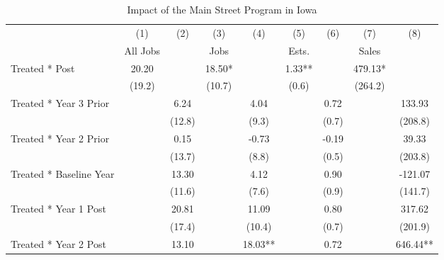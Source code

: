 \begin{table}[htbp]\centering
\def\sym#1{\ifmmode^{#1}\else\(^{#1}\)\fi}
\caption{Impact of the Main Street Program in Iowa}
\begin{tabular}{l*{8}{c}}
\hline\hline
            &\multicolumn{1}{c}{(1)}   &\multicolumn{1}{c}{(2)}   &\multicolumn{1}{c}{(3)}   &\multicolumn{1}{c}{(4)}   &\multicolumn{1}{c}{(5)}   &\multicolumn{1}{c}{(6)}   &\multicolumn{1}{c}{(7)}   &\multicolumn{1}{c}{(8)}   \\
            &    All Jobs   &               &        Jobs   &               &       Ests.   &               &       Sales   &               \\
\hline
Treated * Post&       20.20   &               &       18.50*  &               &        1.33** &               &      479.13*  &               \\
            &      (19.2)   &               &      (10.7)   &               &       (0.6)   &               &     (264.2)   &               \\
Treated * Year 3 Prior&               &        6.24   &               &        4.04   &               &        0.72   &               &      133.93   \\
            &               &      (12.8)   &               &       (9.3)   &               &       (0.7)   &               &     (208.8)   \\
Treated * Year 2 Prior&               &        0.15   &               &       -0.73   &               &       -0.19   &               &       39.33   \\
            &               &      (13.7)   &               &       (8.8)   &               &       (0.5)   &               &     (203.8)   \\
Treated * Baseline Year&               &       13.30   &               &        4.12   &               &        0.90   &               &     -121.07   \\
            &               &      (11.6)   &               &       (7.6)   &               &       (0.9)   &               &     (141.7)   \\
Treated * Year 1 Post&               &       20.81   &               &       11.09   &               &        0.80   &               &      317.62   \\
            &               &      (17.4)   &               &      (10.4)   &               &       (0.7)   &               &     (201.9)   \\
Treated * Year 2 Post&               &       13.10   &               &       18.03** &               &        0.72   &               &      646.44** \\

\end{tabular}
\end{table}
